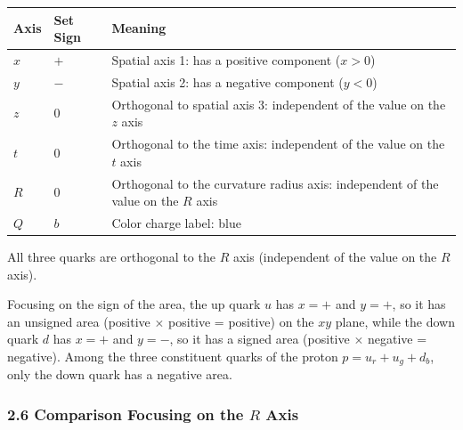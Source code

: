 \documentclass[
  a4paper,11pt]{article}
\newcounter{none}
\theoremstyle{definition}
\theoremstyle{remark}
\begin{document}
{\def\LTcaptype{none} %
\begin{longtable}[]{@{}
  >{\centering\arraybackslash}p{}
  >{\centering\arraybackslash}p{}
  >{\raggedright\arraybackslash}p{}@{}}
\toprule\noalign{}
\begin{minipage}[b]{\linewidth}\centering
Axis
\end{minipage} & \begin{minipage}[b]{\linewidth}\centering
Set Sign
\end{minipage} & \begin{minipage}[b]{\linewidth}\raggedright
Meaning
\end{minipage} \\
\midrule\noalign{}
\endhead
\bottomrule\noalign{}
\endlastfoot
\(x\) & \(+\) & Spatial axis 1: has a positive component (\(x > 0\)) \\
\(y\) & \(-\) & Spatial axis 2: has a negative component (\(y < 0\)) \\
\(z\) & \(0\) & Orthogonal to spatial axis 3: independent of the value
on the \(z\) axis \\
\(t\) & \(0\) & Orthogonal to the time axis: independent of the value on
the \(t\) axis \\
\(R\) & \(0\) & Orthogonal to the curvature radius axis: independent of
the value on the \(R\) axis \\
\(Q\) & \(b\) & Color charge label: blue \\
\end{longtable}
}

All three quarks are orthogonal to the \(R\) axis (independent of the
value on the \(R\) axis).

Focusing on the sign of the area, the up quark \(u\) has \(x = +\) and
\(y = +\), so it has an unsigned area (positive \(\times\) positive =
positive) on the \(xy\) plane, while the down quark \(d\) has \(x = +\)
and \(y = -\), so it has a signed area (positive \(\times\) negative =
negative). Among the three constituent quarks of the proton
\(p = u_r + u_g + d_b\), only the down quark has a negative area.

\subsubsection{\texorpdfstring{2.6 Comparison Focusing on the \(R\)
Axis}{2.6 Comparison Focusing on the R Axis}}\label{comparison-focusing-on-the-r-axis}
\end{document}
